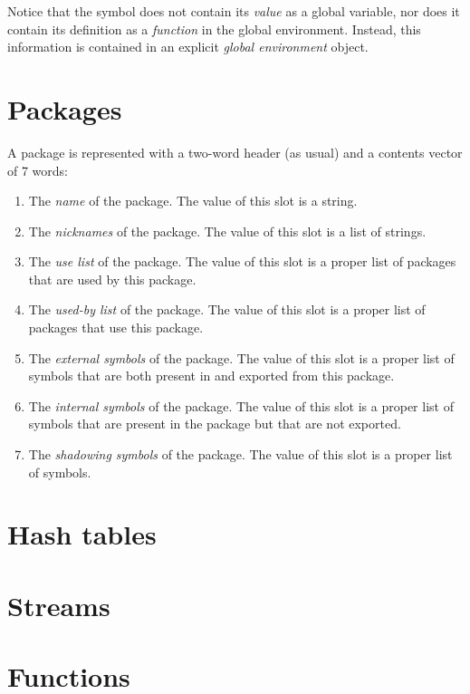 Notice that the symbol does not contain its \emph{value} as a global
variable, nor does it contain its definition as a \emph{function} in
the global environment.  Instead, this information is contained in an
explicit \emph{global environment} object.

\section{Packages}

A package is represented with a two-word header (as usual) and a
contents vector of 7 words:

\begin{enumerate}
\item The \emph{name} of the package.  The value of this slot is a
  string.
\item The \emph{nicknames} of the package.  The value of this slot is
  a list of strings. 
\item The \emph{use list} of the package.  The value of this slot is a
  proper list of packages that are used by this package. 
\item The \emph{used-by list} of the package.  The value of this slot
is a proper list of packages that use this package. 
\item The \emph{external symbols} of the package.  The value of this
  slot is a proper list of symbols that are both present in and
  exported from this package.
\item The \emph{internal symbols} of the package.  The value of this
  slot is a proper list of symbols that are present in the package but
  that are not exported.
\item The \emph{shadowing symbols} of the package.  The value of this
  slot is a proper list of symbols. 
\end{enumerate}

\section{Hash tables}

\section{Streams}

\section{Functions}

